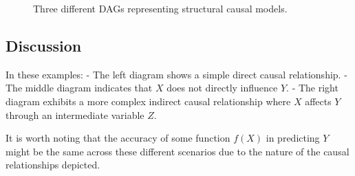 \documentclass{article}
\begin{document}
\begin{figure}[h]
    \centering
    \caption{Three different DAGs representing structural causal models.}
    \label{fig:dags}
\end{figure}

\subsection*{Discussion}

In these examples:
- The left diagram shows a simple direct causal relationship.
- The middle diagram indicates that \( X \) does not directly influence \( Y \).
- The right diagram exhibits a more complex indirect causal relationship where \( X \) affects \( Y \) through an intermediate variable \( Z \).

It is worth noting that the accuracy of some function \( f(X) \) in predicting \( Y \) might be the same across these different scenarios due to the nature of the causal relationships depicted.
\end{document}
